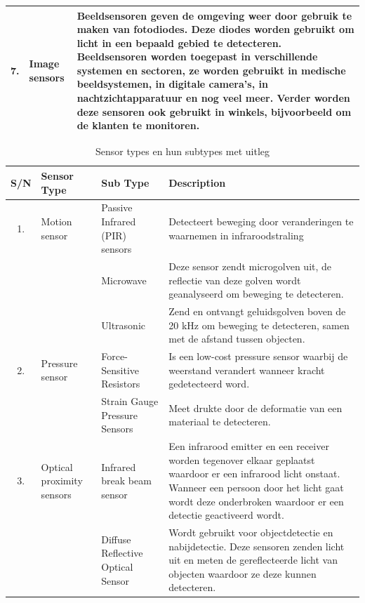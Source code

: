\begin{table}[h]
\begin{tabular}{|c|m{4cm}|m{10cm}|}
        \hline
        7. & Image sensors & Beeldsensoren geven de omgeving weer door gebruik te maken van fotodiodes. Deze diodes worden gebruikt om licht in een bepaald gebied te detecteren. Beeldsensoren worden toegepast in verschillende systemen en sectoren, ze worden gebruikt in medische beeldsystemen, in digitale camera's, in nachtzichtapparatuur en nog veel meer. Verder worden deze sensoren ook gebruikt in winkels, bijvoorbeeld om de klanten te monitoren. \\
        \hline
    \end{tabular}
    \label{tab:sensors}
\end{table}


\begin{table}[h]
    \raggedright
    \renewcommand{\arraystretch}{1.3}
    \tiny
    \caption{Sensor types en hun subtypes met uitleg \autocite{Yadav2020, Sasi2021, Chawuthai2018, Wei2024, Kleeman2018, Doubek2016, Palanisamy2021, Halvorsen2009, Ghemari2023, Lattanzi2023, Hutagalung2021, Wu2023, Hoberg2011, Lo2013, Braun2015, Vukonic2022, Sarkar2013, BlancoFilgueira2016, RadhaKrishna2021, Mehta2015, Sundar2015, Wu2005, Bieszczad2011, Chen1994, Pop2009, Ajmera2018, Javed2017, Jacobs2009, Preradovic2009, Mockler2010, Spachos2020}}
    \begin{tabular}{|c|m{3cm}|m{3.5cm}|m{7.5cm}|}
        \hline
        \textbf{S/N} & \textbf{Sensor Type} & \textbf{Sub Type} & \textbf{Description} \\
        \hline
        1. & Motion sensor & Passive Infrared (PIR) sensors & Detecteert beweging door veranderingen te waarnemen in infraroodstraling \\
        & & Microwave & Deze sensor zendt microgolven uit, de reflectie van deze golven wordt geanalyseerd om beweging te detecteren. \\
        & & Ultrasonic & Zend en ontvangt geluidsgolven boven de 20 kHz om beweging te detecteren, samen met de afstand tussen objecten. \\
        \hline
        2. & Pressure sensor & Force-Sensitive Resistors & Is een low-cost pressure sensor waarbij de weerstand verandert wanneer kracht gedetecteerd word.\\ & & Strain Gauge Pressure Sensors & Meet drukte door de deformatie van een materiaal te detecteren. \\
        \hline
        3. & Optical proximity sensors & Infrared break beam sensor & Een infrarood emitter en een receiver worden tegenover elkaar geplaatst waardoor er een infrarood licht onstaat. Wanneer een persoon door het licht gaat wordt deze onderbroken waardoor er een detectie geactiveerd wordt.  \\ & &  Diffuse Reflective Optical Sensor & Wordt gebruikt voor objectdetectie en nabijdetectie. Deze sensoren zenden licht uit en meten de gereflecteerde licht van objecten waardoor ze deze kunnen detecteren.\\

\end{tabular}
\end{table}
